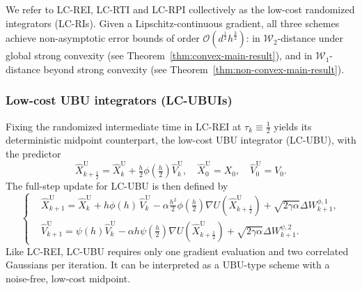\documentclass[12pt]{article}
\numberwithin{equation}{section}
\begin{document}
We refer to LC-REI, LC-RTI and LC-RPI collectively as the
low-cost randomized integrators (LC-RIs). Given a
Lipschitz-continuous gradient, all three schemes achieve
non-asymptotic error bounds of order
$\mathcal O(d^{\frac12}h^{\frac32})$: in
$\mathcal W_2$-distance under global strong convexity
(see Theorem~\ref{thm:convex-main-result}), and in $\mathcal W_1$-distance beyond strong convexity
(see Theorem~\ref{thm:non-convex-main-result}).

\subsubsection{Low-cost UBU integrators (LC-UBUIs)}
Fixing the randomized intermediate time in LC-REI at
$\tau_k\equiv\frac12$ yields its deterministic midpoint counterpart,
the low-cost UBU integrator (LC-UBU), with the predictor
\begin{equation}\label{eq:LC-UBU-1}
\widehat{X}^{\mathrm{U}}_{k+\frac{1}{2}} 
=  
\widehat{X}^{\mathrm{U}}_k 
+ 
\tfrac{h}{2}\phi(\tfrac{h}{2})\widehat{V}^{\mathrm{U}}_k,
\quad 
\widehat{X}^{\mathrm{U}}_{0}
=
X_0,
\quad 
\widehat{V}^{\mathrm{U}}_{0}
=
V_0.
\end{equation}
The full-step update for LC-UBU is then defined by
\begin{equation}
\label{eq:LC-UBU}
\left\{
\begin{aligned}
&
\widehat{X}^{\mathrm{U}}_{k+1} 
=  
\widehat{X}^{\mathrm{U}}_k + h\phi (h)\, \widehat{V}^{\mathrm{U}}_k -
\alpha 
\tfrac{h^2}{2} 
\phi (\tfrac{h}{2}) \nabla U(\widehat{X}^{\mathrm{U}}_{k+\frac{1}{2}}) 
+ 
\sqrt{2\gamma\alpha} 
\Delta W_{k+1}^{\phi,1},
\\
&\widehat{V}^{\mathrm{U}}_{k+1} =   
\psi(h) \widehat{V}^{\mathrm{U}}_k
-
\alpha h \psi(\tfrac{h}{2} ) \nabla U (\widehat{X}^{\mathrm{U}}_{k+\frac{1}{2}})
+
\sqrt{2\gamma\alpha} 
\Delta W_{k+1}^{\psi,2}.
\end{aligned}
\right.
\end{equation}
Like LC-REI, LC-UBU requires only one gradient evaluation and two
correlated Gaussians per iteration. It can be interpreted as a UBU-type scheme with a
noise-free, low-cost midpoint.
\end{document}
